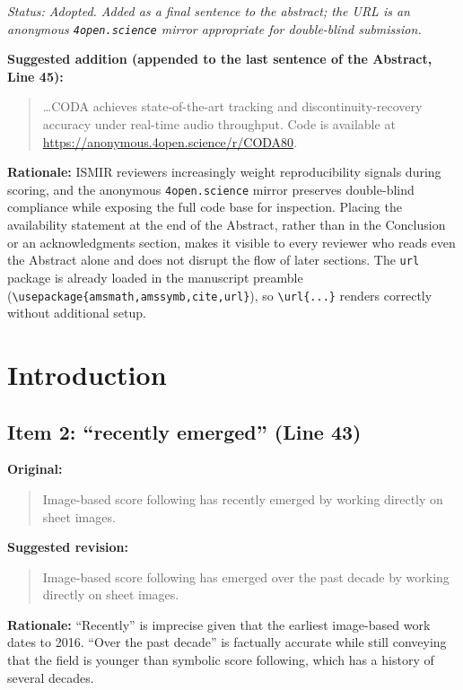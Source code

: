 \documentclass{article}
\begin{document}
\textit{Status: Adopted. Added as a final sentence to the abstract; the URL is an anonymous \texttt{4open.science} mirror appropriate for double-blind submission.}

\textbf{Suggested addition (appended to the last sentence of the Abstract, Line 45):}
\begin{quote}
\ldots CODA achieves state-of-the-art tracking and discontinuity-recovery accuracy under real-time audio throughput. Code is available at \url{https://anonymous.4open.science/r/CODA80}.
\end{quote}

\textbf{Rationale:}
ISMIR reviewers increasingly weight reproducibility signals during scoring, and the anonymous \texttt{4open.science} mirror preserves double-blind compliance while exposing the full code base for inspection. Placing the availability statement at the end of the Abstract, rather than in the Conclusion or an acknowledgments section, makes it visible to every reviewer who reads even the Abstract alone and does not disrupt the flow of later sections. The \texttt{url} package is already loaded in the manuscript preamble (\texttt{\textbackslash usepackage\{amsmath,amssymb,cite,url\}}), so \texttt{\textbackslash url\{...\}} renders correctly without additional setup.


\section*{Introduction}

\subsection*{Item 2: ``recently emerged'' (Line 43)}

\textbf{Original:}
\begin{quote}
Image-based score following has recently emerged by working directly on sheet images.
\end{quote}

\textbf{Suggested revision:}
\begin{quote}
Image-based score following has emerged over the past decade by working directly on sheet images.
\end{quote}

\textbf{Rationale:}
``Recently'' is imprecise given that the earliest image-based work dates to 2016. ``Over the past decade'' is factually accurate while still conveying that the field is younger than symbolic score following, which has a history of several decades.
\end{document}
